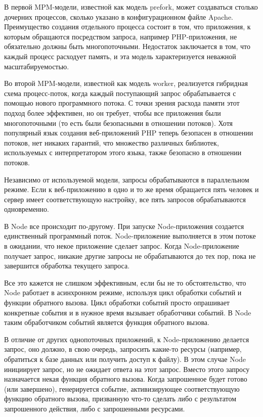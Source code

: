 В первой MPM-модели, известной как модель prefork, может создаваться столько дочерних процессов, сколько указано в конфигурационном файле Apache. Преимущество создания отдельного процесса состоит в том, что приложения, к которым обращаются посредством запроса, например PHP-приложения, не обязательно должны быть многопоточными. Недостаток заключается в том, что каждый процесс расходует память, и эта модель характеризуется неважной масштабируемостью.

Во второй MPM-модели, известной как модель worker, реализуется гибридная схема процесс-поток, когда каждый поступающий запрос обрабатывается с помощью нового программного потока. С точки зрения расхода памяти этот подход более эффективен, но он требует, чтобы все приложения были многопоточными (то есть были безопасными в отношении потоков). Хотя популярный язык создания веб-приложений PHP теперь безопасен в отношении потоков, нет никаких гарантий, что множество различных библиотек, используемых с интерпретатором этого языка, также безопасно в отношении потоков.

Независимо от используемой модели, запросы обрабатываются в параллельном режиме. Если к веб-приложению в одно и то же время обращается пять человек и сервер имеет соответствующую настройку, все пять запросов обрабатываются одновременно.

В Node все происходит по-другому. При запуске Node-приложения создается единственный программный поток. Node-приложение выполняется в этом потоке в ожидании, что некое приложение сделает запрос. Когда Node-приложение получает запрос, никакие другие запросы не обрабатываются до тех пор, пока не завершится обработка текущего запроса.

Все это кажется не слишком эффективным, если бы не то обстоятельство, что Node работает в асинхронном режиме, используя цикл обработки событий и функции обратного вызова. Цикл обработки событий просто опрашивает конкретные события и в нужное время вызывает обработчики событий. В Node таким обработчиком событий является функция обратного вызова.

В отличие от других однопоточных приложений, к Node-приложению делается запрос, оно должно, в свою очередь, запросить какие-то ресурсы (например, обратиться к базе данных или получить доступ к файлу). В этом случае Node инициирует запрос, но не ожидает ответа на этот запрос. Вместо этого запросу назначается некая функция обратного вызова. Когда запрошенное будет готово (или завершено), генерируется событие, активизирующее соответствующую функцию обратного вызова, призванную что-то сделать либо с результатом запрошенного действия, либо с запрошенными ресурсами.

